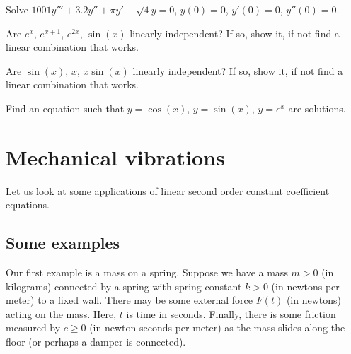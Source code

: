 \begin{exercise}
Solve $1001y'''+3.2y''+\pi y'-\sqrt{4} y = 0$, $y(0)=0$, $y'(0) = 0$,
$y''(0) = 0$.
\end{exercise}

\begin{exercise}
Are $e^{x}$, $e^{x+1}$, $e^{2x}$, $\sin(x)$ linearly independent?
If so, show it, if not find a linear combination that works.
\end{exercise}

\begin{exercise}
Are $\sin(x)$, $x$, $x\sin(x)$ linearly independent?
If so, show it, if not find a linear combination that works.
\end{exercise}

\begin{exercise}
Find an equation such that $y=\cos(x)$, $y=\sin(x)$, $y=e^x$ are solutions.
\end{exercise}


\sectionnewpage
\section{Mechanical vibrations} \label{sec:mv}



Let us look at some applications of linear second order constant
coefficient equations.

\subsection{Some examples}

\begin{mywrapfigsimp}{2.0in}{2.3in}
\noindent
{}
\end{mywrapfigsimp}
Our first example is a mass on a spring.  Suppose we have a mass $m > 0$
(in kilograms) connected
by a spring with spring constant $k > 0$ (in newtons per meter)
to a fixed wall.  There may be some external
force $F(t)$ (in newtons) acting on the mass.
Here, $t$ is time in seconds.  Finally, there is some
friction measured by $c \geq 0$ (in newton-seconds per meter) as the mass
slides along the floor (or perhaps a damper is connected).

